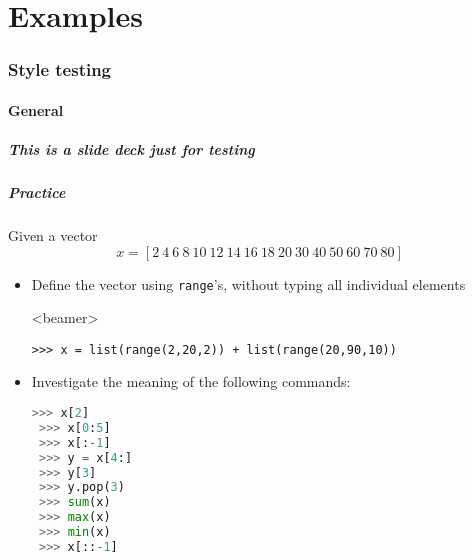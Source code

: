 \part{Examples}
\section{Style testing}
\subsection*{General}
\begin{frame}[label=contents_sample]
  \frametitle{This is a slide deck just for testing}
\end{frame}


\begin{frame}[fragile]
  \frametitle{Practice}
  Given a vector 
  \[ 
     x = \left[2 \ 4 \ 6 \ 8 \ 10 \ 12 \ 14 \ 16 \ 18 \ 20 \ 30 \ 40 \ 50 \ 60 \ 70 \ 80 \right]
  \]
  \begin{itemize}
   \item Define the vector using \lstinline|range|'s, without typing all individual elements
   \pause
   \begin{onlyenv}<beamer> \begin{lstlisting}[]
 >>> x = list(range(2,20,2)) + list(range(20,90,10))
     \end{lstlisting}
     \pause
    \end{onlyenv}
   \item Investigate the meaning of the following commands:
   \begin{lstlisting}[language=Python, numbers=none]
 >>> x[2]            
 >>> x[0:5]          
 >>> x[:-1]          
 >>> y = x[4:]       
 >>> y[3]            
 >>> y.pop(3)      
 >>> sum(x)    
 >>> max(x)       
 >>> min(x) 
 >>> x[::-1]       
     \end{lstlisting}    
  \end{itemize}
 \end{frame}
